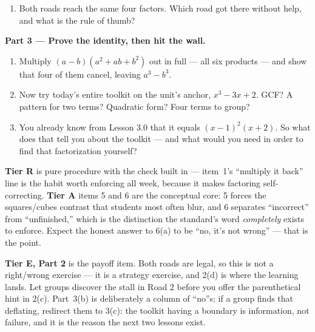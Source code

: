 \documentclass[10pt]{article}
\begin{document}
\begin{tcolorbox}[colback=white, colframe=black!40, title=\textbf{Tier E --- Extension},
    fonttitle=\bfseries, arc=1.5mm, left=3mm, right=3mm, top=2mm, bottom=2mm, breakable]
\begin{enumerate}[label=(\alph*), leftmargin=1.8em, itemsep=6pt]
  \item Both roads reach the same four factors. Which road got there without help, and what is the
        rule of thumb? 
\end{enumerate}

\vspace{5pt}
\textbf{Part 3 --- Prove the identity, then hit the wall.}
\begin{enumerate}[label=(\alph*), leftmargin=1.8em, itemsep=6pt]
  \item Multiply $(a-b)(a^2+ab+b^2)$ out in full --- all six products --- and show that four of them
        cancel, leaving $a^3 - b^3$. 
  \item Now try today's entire toolkit on the unit's anchor, $x^3 - 3x + 2$. GCF?  \;
        A pattern for two terms?  \; Quadratic form?  \; Four terms to
        group? 
  \item You already know from Lesson 3.0 that it equals $(x-1)^2(x+2)$. So what does that tell you
        about the toolkit --- and what would you need in order to find that factorization yourself?
\end{enumerate}
\end{tcolorbox}

\begin{teachernote}
\textbf{Tier R} is pure procedure with the check built in --- item~1's ``multiply it back'' line is the
habit worth enforcing all week, because it makes factoring self-correcting. \textbf{Tier A} items 5
and 6 are the conceptual core: 5 forces the squares/cubes contrast that students most often blur, and
6 separates ``incorrect'' from ``unfinished,'' which is the distinction the standard's word
\emph{completely} exists to enforce. Expect the honest answer to 6(a) to be ``no, it's not wrong'' ---
that is the point.

\vspace{3pt}
\textbf{Tier E, Part 2} is the payoff item. Both roads are legal, so this is not a right/wrong
exercise --- it is a strategy exercise, and 2(d) is where the learning lands. Let groups discover the
stall in Road 2 before you offer the parenthetical hint in 2(c). Part~3(b) is deliberately a column of
``no''s; if a group finds that deflating, redirect them to 3(c): the toolkit having a boundary is
information, not failure, and it is the reason the next two lessons exist.
\end{teachernote}
\end{document}
